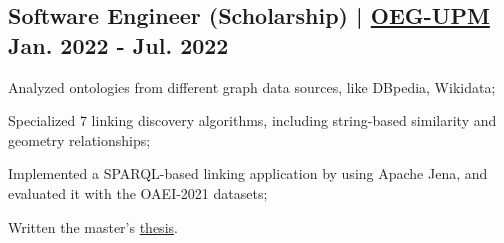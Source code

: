 \subsection{{Software Engineer (Scholarship) | \href{https://oeg.fi.upm.es}{OEG-UPM} \hfill Jan. 2022 - Jul. 2022}}
\begin{zitemize}
    \item  Analyzed ontologies from different graph data sources, like DBpedia, Wikidata;
    \item  Specialized 7 linking discovery algorithms, including string-based similarity and geometry relationships;
    \item  Implemented a SPARQL-based linking application by using Apache Jena, and evaluated it with the OAEI-2021 datasets;
    \item  Written the master's \href{https://oa.upm.es/71452/}{thesis}.
\end{zitemize}

